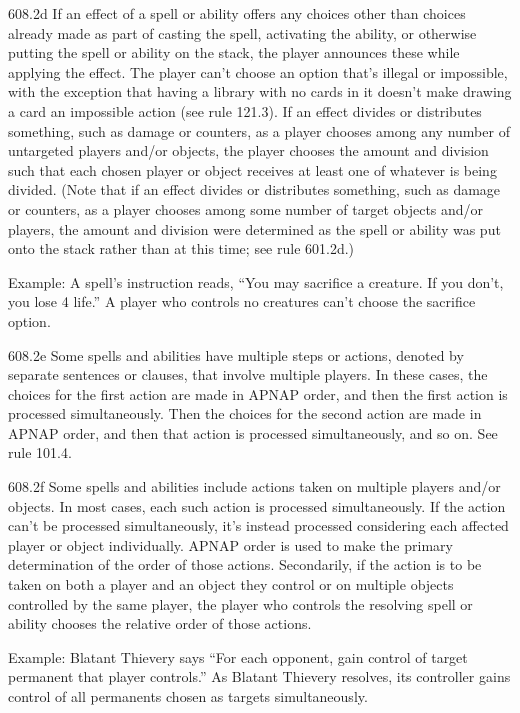 608.2d If an effect of a spell or ability offers any choices other than choices already made as part of casting the spell, activating the ability, or otherwise putting the spell or ability on the stack, the player announces these while applying the effect. The player can’t choose an option that’s illegal or impossible, with the exception that having a library with no cards in it doesn’t make drawing a card an impossible action (see rule 121.3). If an effect divides or distributes something, such as damage or counters, as a player chooses among any number of untargeted players and/or objects, the player chooses the amount and division such that each chosen player or object receives at least one of whatever is being divided. (Note that if an effect divides or distributes something, such as damage or counters, as a player chooses among some number of target objects and/or players, the amount and division were determined as the spell or ability was put onto the stack rather than at this time; see rule 601.2d.)

Example: A spell’s instruction reads, “You may sacrifice a creature. If you don’t, you lose 4 life.” A player who controls no creatures can’t choose the sacrifice option.

608.2e Some spells and abilities have multiple steps or actions, denoted by separate sentences or clauses, that involve multiple players. In these cases, the choices for the first action are made in APNAP order, and then the first action is processed simultaneously. Then the choices for the second action are made in APNAP order, and then that action is processed simultaneously, and so on. See rule 101.4.

608.2f Some spells and abilities include actions taken on multiple players and/or objects. In most cases, each such action is processed simultaneously. If the action can’t be processed simultaneously, it’s instead processed considering each affected player or object individually. APNAP order is used to make the primary determination of the order of those actions. Secondarily, if the action is to be taken on both a player and an object they control or on multiple objects controlled by the same player, the player who controls the resolving spell or ability chooses the relative order of those actions.

Example: Blatant Thievery says “For each opponent, gain control of target permanent that player controls.” As Blatant Thievery resolves, its controller gains control of all permanents chosen as targets simultaneously.

